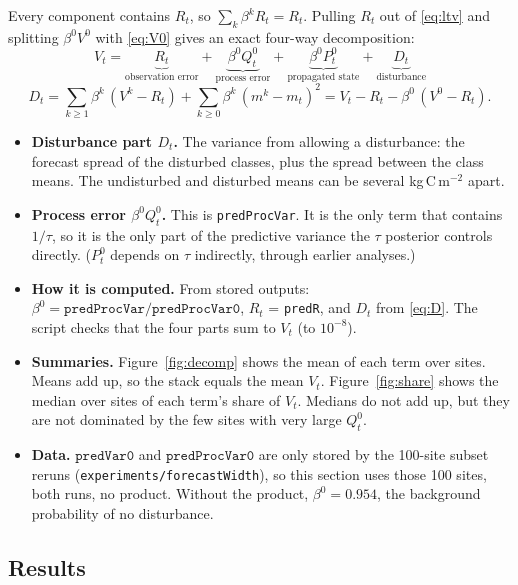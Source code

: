 \documentclass[11pt]{article}
\newcommand{\code}[1]{\texttt{#1}}
\begin{document}
Every component contains $R_t$, so $\sum_k \beta^k R_t = R_t$. Pulling $R_t$ out of
\eqref{eq:ltv} and splitting $\beta^0 V^0$ with \eqref{eq:V0} gives an exact four-way
decomposition:
\begin{equation}
  \boxed{\;V_t = \underbrace{R_t}_{\text{observation error}}
  + \underbrace{\beta^0 Q^0_t}_{\text{process error}}
  + \underbrace{\beta^0 P^0_t}_{\text{propagated state}}
  + \underbrace{D_t}_{\text{disturbance}}\;}
  \label{eq:decomp}
\end{equation}
\begin{equation}
  D_t = \sum_{k \ge 1}\beta^k\,(V^k - R_t) + \sum_{k \ge 0}\beta^k\,(m^k - m_t)^2
      = V_t - R_t - \beta^0\,(V^0 - R_t) .
  \label{eq:D}
\end{equation}
\begin{itemize}
  \item \textbf{Disturbance part $D_t$.} The variance from allowing a disturbance: the forecast spread of the disturbed
  classes, plus the spread between the class means. The undisturbed and disturbed means can be
  several kg\,C\,m$^{-2}$ apart.
  \item \textbf{Process error $\beta^0 Q^0_t$.} This is \code{predProcVar}. It is the only term that contains $1/\tau$, so it is
  the only part of the predictive variance the $\tau$ posterior controls directly. ($P^0_t$
  depends on $\tau$ indirectly, through earlier analyses.)
  \item \textbf{How it is computed.} From stored outputs: $\beta^0 = \code{predProcVar}/\code{predProcVar0}$, $R_t$ =
  \code{predR}, and $D_t$ from \eqref{eq:D}. The script checks that the four parts sum to
  $V_t$ (to $10^{-8}$).
  \item \textbf{Summaries.} Figure~\ref{fig:decomp} shows the mean of each term over sites. Means add up, so
  the stack equals the mean $V_t$. Figure~\ref{fig:share} shows the median over sites of each term's
  share of $V_t$. Medians do not add up, but they are not dominated by the few sites with
  very large $Q^0_t$.
  \item \textbf{Data.} $\code{predVar0}$ and $\code{predProcVar0}$ are only stored by the 100-site subset reruns
  (\code{experiments/forecastWidth}), so this section uses those 100 sites, both runs, no
  product. Without the product, $\beta^0 = 0.954$, the background probability of no disturbance.
\end{itemize}

\subsection{Results}
\end{document}
